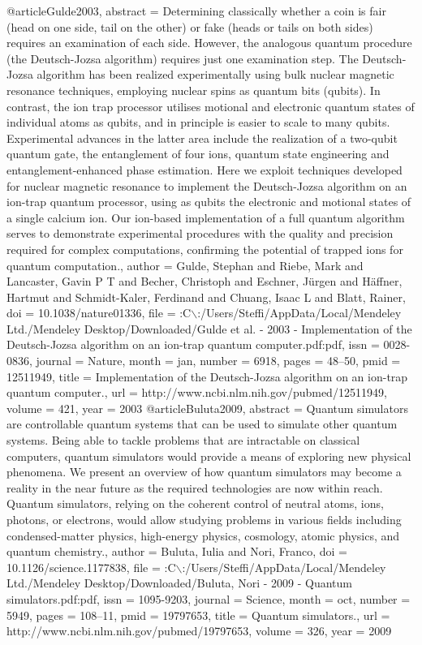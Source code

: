@article{Gulde2003,
abstract = {Determining classically whether a coin is fair (head on one side, tail on the other) or fake (heads or tails on both sides) requires an examination of each side. However, the analogous quantum procedure (the Deutsch-Jozsa algorithm) requires just one examination step. The Deutsch-Jozsa algorithm has been realized experimentally using bulk nuclear magnetic resonance techniques, employing nuclear spins as quantum bits (qubits). In contrast, the ion trap processor utilises motional and electronic quantum states of individual atoms as qubits, and in principle is easier to scale to many qubits. Experimental advances in the latter area include the realization of a two-qubit quantum gate, the entanglement of four ions, quantum state engineering and entanglement-enhanced phase estimation. Here we exploit techniques developed for nuclear magnetic resonance to implement the Deutsch-Jozsa algorithm on an ion-trap quantum processor, using as qubits the electronic and motional states of a single calcium ion. Our ion-based implementation of a full quantum algorithm serves to demonstrate experimental procedures with the quality and precision required for complex computations, confirming the potential of trapped ions for quantum computation.},
author = {Gulde, Stephan and Riebe, Mark and Lancaster, Gavin P T and Becher, Christoph and Eschner, J{\"{u}}rgen and H{\"{a}}ffner, Hartmut and Schmidt-Kaler, Ferdinand and Chuang, Isaac L and Blatt, Rainer},
doi = {10.1038/nature01336},
file = {:C$\backslash$:/Users/Steffi/AppData/Local/Mendeley Ltd./Mendeley Desktop/Downloaded/Gulde et al. - 2003 - Implementation of the Deutsch-Jozsa algorithm on an ion-trap quantum computer.pdf:pdf},
issn = {0028-0836},
journal = {Nature},
month = {jan},
number = {6918},
pages = {48--50},
pmid = {12511949},
title = {{Implementation of the Deutsch-Jozsa algorithm on an ion-trap quantum computer.}},
url = {http://www.ncbi.nlm.nih.gov/pubmed/12511949},
volume = {421},
year = {2003}
}
@article{Buluta2009,
abstract = {Quantum simulators are controllable quantum systems that can be used to simulate other quantum systems. Being able to tackle problems that are intractable on classical computers, quantum simulators would provide a means of exploring new physical phenomena. We present an overview of how quantum simulators may become a reality in the near future as the required technologies are now within reach. Quantum simulators, relying on the coherent control of neutral atoms, ions, photons, or electrons, would allow studying problems in various fields including condensed-matter physics, high-energy physics, cosmology, atomic physics, and quantum chemistry.},
author = {Buluta, Iulia and Nori, Franco},
doi = {10.1126/science.1177838},
file = {:C$\backslash$:/Users/Steffi/AppData/Local/Mendeley Ltd./Mendeley Desktop/Downloaded/Buluta, Nori - 2009 - Quantum simulators.pdf:pdf},
issn = {1095-9203},
journal = {Science},
month = {oct},
number = {5949},
pages = {108--11},
pmid = {19797653},
title = {{Quantum simulators.}},
url = {http://www.ncbi.nlm.nih.gov/pubmed/19797653},
volume = {326},
year = {2009}
}
